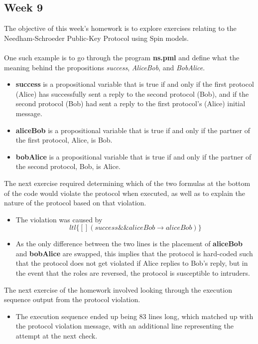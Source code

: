 \documentclass{article}
\theoremstyle{theorem}
\theoremstyle{definition}
\theoremstyle{remark}
\begin{document}
\subsection{Week 9}
The objective of this week's homework is to explore exercises relating to the Needham-Schroeder Public-Key Protocol using Spin models.
\\
\\ One such example is to go through the program \textbf{ns.pml} and define what the meaning behind the propositions \textit{success}, \textit{AliceBob}, and \textit{BobAlice}.
\begin{itemize}
\item \textbf{success} is a propositional variable that is true if and only if the first protocol (Alice) has successfully sent a reply to the second protocol (Bob), and if the second protocol (Bob) had sent a reply to the first protocol's (Alice) initial message.
\item \textbf{aliceBob} is a propositional variable that is true if and only if the partner of the first protocol, Alice, is Bob.
\item \textbf{bobAlice} is a propositional variable that is true if and only if the partner of the second protocol, Bob, is Alice.
\end{itemize}
The next exercise required determining which of the two formulas at the bottom of the code would violate the protocol when executed, as well as to explain the nature of the protocol based on that violation. \\
\begin{itemize}
    \item The violation was caused by $$ltl \{[]  (success \&\& aliceBob \xrightarrow{} aliceBob)\}$$
    \item As the only difference between the two lines is the placement of \textbf{aliceBob} and \textbf{bobAlice} are swapped, this implies that the protocol is hard-coded such that the protocol does not get violated if Alice replies to Bob's reply, but in the event that the roles are reversed, the protocol is susceptible to intruders.
\end{itemize}
The next exercise of the homework involved looking through the execution sequence output from the protocol violation.
\begin{itemize}
    \item The execution sequence ended up being 83 lines long, which matched up with the protocol violation message, with an additional line representing the attempt at the next check.
\end{itemize}
\end{document}
